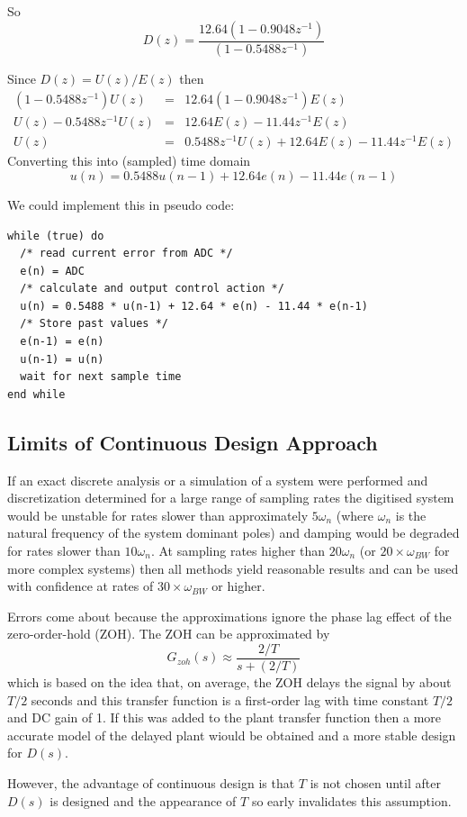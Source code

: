 So $$D(z) = \frac{12.64(1-0.9048z^{-1})}{(1-0.5488z^{-1})}$$

Since $D(z)=U(z)/E(z)$ then 
\begin{eqnarray*}
	(1-0.5488z^{-1})U(z) & = & 12.64(1-0.9048z^{-1})E(z) \\
	U(z) - 0.5488z^{-1}U(z) & = & 12.64 E(z) - 11.44 z^{-1} E(z) \\
	U(z) & = & 0.5488z^{-1}U(z) + 12.64 E(z) - 11.44 z^{-1} E(z)
\end{eqnarray*}	
Converting this into (sampled) time domain
$$u(n) = 0.5488 u(n-1) + 12.64 e(n) - 11.44 e(n-1)$$

We could implement this in pseudo code:
\begin{verbatim}
while (true) do
  /* read current error from ADC */
  e(n) = ADC 
  /* calculate and output control action */
  u(n) = 0.5488 * u(n-1) + 12.64 * e(n) - 11.44 * e(n-1)
  /* Store past values */
  e(n-1) = e(n)
  u(n-1) = u(n)
  wait for next sample time
end while
\end{verbatim}


\subsection*{Limits of Continuous Design Approach}

If an exact discrete analysis or a simulation of a system were performed and discretization determined for a large range of sampling rates the digitised system would be unstable for rates slower than approximately $5\omega_n$ (where $\omega_n$ is the natural frequency of the system dominant poles) and damping would be degraded for rates slower than $10\omega_n$. At sampling rates higher than $20\omega_n$ (or $20\times \omega_{BW}$ for more complex systems) then all methods yield reasonable results and can be used with confidence at rates of $30\times \omega_{BW}$ or higher.

Errors come about because the approximations ignore the phase lag effect of the zero-order-hold (ZOH). The ZOH can be approximated by $$G_{zoh}(s)\approx \frac{2/T}{s+(2/T)}$$ which is based on the idea that, on average, the ZOH delays the signal by about $T/2$ seconds and this transfer function is a first-order lag with time constant $T/2$ and DC gain of 1. If this was added to the plant transfer function then a more accurate model of the delayed plant wiould be obtained and a more stable design for $D(s)$.

However, the advantage of continuous design is that $T$ is not chosen until after $D(s)$ is designed and the appearance of $T$ so early invalidates this assumption.

